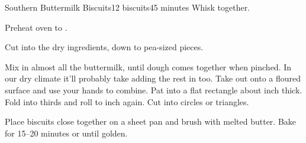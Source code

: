 \documentclass[../Cookbook.tex]{subfiles}
\begin{document}
\begin{recipe}[SouthernButtermilkBiscuits]{Southern Buttermilk Biscuits}{12 biscuits}{45 minutes}
Whisk together.

Preheat oven to .

Cut into the dry ingredients, down to pea-sized pieces.

Mix in almost all the buttermilk, until dough comes together when pinched.
In our dry climate it'll probably take adding the rest in too.
Take out onto a floured surface and use your hands to combine.
Pat into a flat rectangle about  inch thick.
Fold into thirds and roll to  inch again.
Cut into circles or triangles.

Place biscuits close together on a sheet pan and brush with melted butter.
Bake for 15--20 minutes or until golden.

\end{recipe}
\end{document}

